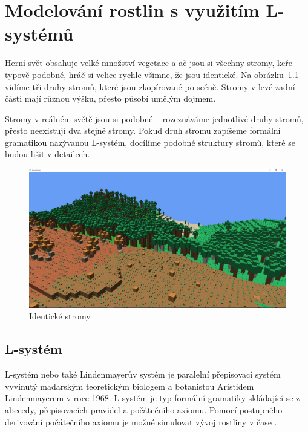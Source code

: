 \documentclass[thesis=M,czech]{FITthesis}[2019/12/23]
\begin{document}

\chapter{Modelování rostlin s využitím L-systémů}
Herní svět obsahuje velké množství vegetace a ač jsou si všechny stromy, keře typově podobné, hráč si velice rychle všimne, že jsou identické. Na obrázku~\ref{fig:identicke_stromy} vidíme tři druhy stromů, které jsou zkopírované po scéně. Stromy v levé zadní části mají různou výšku, přesto působí umělým dojmem.

Stromy v reálném světě jsou si podobné -- rozeznáváme jednotlivé druhy stromů, přesto neexistují dva stejné stromy. Pokud druh stromu zapíšeme formální gramatikou nazývanou L-systém, docílíme podobné struktury stromů, které se budou lišit v detailech.

\begin{figure}\centering
	\includegraphics[width=\textwidth]{images/identical_trees}
	\caption[Identické stromy]{Identické stromy}\label{fig:identicke_stromy}
\end{figure}

\section{L-systém}
L-systém nebo také Lindenmayerův systém je paralelní přepisovací systém vyvinutý maďarským teoretickým biologem a botanistou Aristidem Lindenmayerem v roce 1968. L-systém je typ formální gramatiky skládající se z abecedy, přepisovacích pravidel a počátečního axiomu. Pomocí postupného derivování počátečního axiomu je možné simulovat vývoj rostliny v čase \cite{pcgbook75}.
\end{document}
